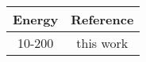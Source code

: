 \begin{tabular}{|c||c|} 
    \hline 
    \bf{Energy} & \bf{Reference} \\
    \hline
    \hline 
    10-200 & this work \\
    \hline
\end{tabular}
